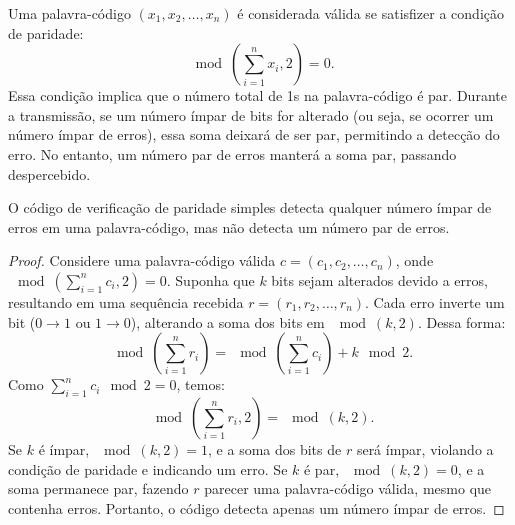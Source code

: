 Uma palavra-código $(x_1, x_2, \dots, x_n)$ é considerada válida se satisfizer a condição de paridade:
\begin{equation}
\mod \left( \sum_{i=1}^{n} x_i, 2 \right) = 0.
\end{equation}
Essa condição implica que o número total de 1s na palavra-código é par. Durante
a transmissão, se um número ímpar de bits for alterado (ou seja, se ocorrer um
número ímpar de erros), essa soma deixará de ser par, permitindo a detecção do
erro. No entanto, um número par de erros manterá a soma par, passando
despercebido.

\begin{theorem}
O código de verificação de paridade simples detecta qualquer número ímpar de
erros em uma palavra-código, mas não detecta um número par de erros.
\end{theorem}
\begin{proof}
Considere uma palavra-código válida $c = (c_1, c_2, \dots, c_n)$, onde
$\mod \left( \sum_{i=1}^{n} c_i, 2 \right) = 0$. Suponha que $k$ bits
sejam alterados devido a erros, resultando em uma sequência recebida 
$r = (r_1, r_2, \dots, r_n)$. Cada erro inverte um bit ($0 \to 1$ ou $1 \to 0$), 
alterando a soma dos bits em $\mod(k, 2)$. Dessa forma:
\begin{equation}
\mod \left( \sum_{i=1}^{n} r_i \right) = \mod \left( \sum_{i=1}^{n} c_i \right) + k \mod 2.
\end{equation}
Como $\sum_{i=1}^{n} c_i \mod 2 = 0$, temos:
\begin{equation}
\mod \left( \sum_{i=1}^{n} r_i, 2 \right) = \mod(k, 2).
\end{equation}
Se $k$ é ímpar, $\mod(k, 2) = 1$, e a soma dos bits de $r$ será ímpar, 
violando a condição de paridade e indicando um erro. Se $k$ é par, 
$\mod(k, 2) = 0$, e a soma permanece par, fazendo $r$ parecer uma 
palavra-código válida, mesmo que contenha erros. 
Portanto, o código detecta apenas um número ímpar de erros.
\end{proof}

